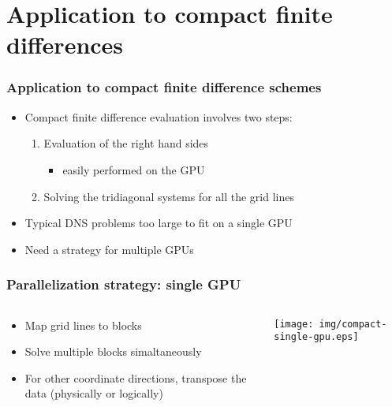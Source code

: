 

\section{Application to compact finite differences}

\begin{frame}
\frametitle{Application to compact finite difference schemes}
\begin{itemize}
\item Compact finite difference evaluation involves two steps:
    \begin{enumerate}
        \item Evaluation of the right hand sides
        \begin{itemize}
            \item easily performed on the GPU
        \end{itemize}
        \item Solving the tridiagonal systems for all the grid lines
    \end{enumerate}
\item Typical DNS problems too large to fit on a single GPU
\item Need a strategy for multiple GPUs
\end{itemize}
\end{frame}

\begin{frame}
\frametitle{Parallelization strategy: single GPU}
\begin{columns}
\begin{column}{0.5\textwidth}
\begin{itemize}
    \item Map grid lines to blocks
    \item Solve multiple blocks simaltaneously
    \item For other coordinate directions,
        transpose the data (physically or logically)
\end{itemize}
\end{column}
\begin{column}{0.5\textwidth}
\texttt{[image: img/compact-single-gpu.eps]}
\end{column}
\end{columns}
\end{frame}

